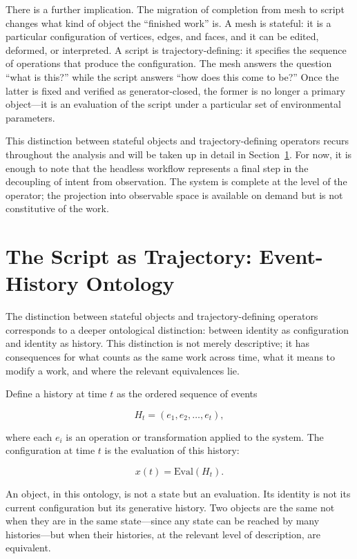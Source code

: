 \documentclass[11pt, twoside]{article}
\theoremstyle{plain}
\theoremstyle{definition}
\theoremstyle{remark}
\begin{document}
There is a further implication. The migration of completion from mesh to script changes what kind of object the ``finished work'' is. A mesh is stateful: it is a particular configuration of vertices, edges, and faces, and it can be edited, deformed, or interpreted. A script is trajectory-defining: it specifies the sequence of operations that produce the configuration. The mesh answers the question ``what is this?'' while the script answers ``how does this come to be?'' Once the latter is fixed and verified as generator-closed, the former is no longer a primary object---it is an evaluation of the script under a particular set of environmental parameters.

This distinction between stateful objects and trajectory-defining operators recurs throughout the analysis and will be taken up in detail in Section~\ref{sec:trajectory}. For now, it is enough to note that the headless workflow represents a final step in the decoupling of intent from observation. The system is complete at the level of the operator; the projection into observable space is available on demand but is not constitutive of the work.

\section{The Script as Trajectory: Event-History Ontology}
\label{sec:trajectory}

The distinction between stateful objects and trajectory-defining operators corresponds to a deeper ontological distinction: between identity as configuration and identity as history. This distinction is not merely descriptive; it has consequences for what counts as the same work across time, what it means to modify a work, and where the relevant equivalences lie.

Define a history at time $t$ as the ordered sequence of events

\[
H_t = (e_1, e_2, \dots, e_t),
\]

where each $e_i$ is an operation or transformation applied to the system. The configuration at time $t$ is the evaluation of this history:

\[
x(t) = \text{Eval}(H_t).
\]

An object, in this ontology, is not a state but an evaluation. Its identity is not its current configuration but its generative history. Two objects are the same not when they are in the same state---since any state can be reached by many histories---but when their histories, at the relevant level of description, are equivalent.
\end{document}
